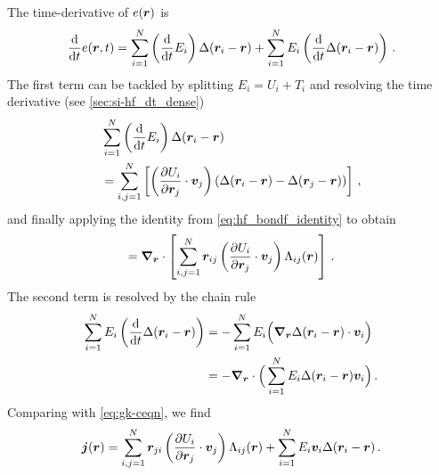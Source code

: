 The time-derivative of $e(\boldsymbol{r})$ is
\begin{equation}
	\frac{\text{d}}{\text{d} t} e(\boldsymbol{r}, t) = \sum_{i=1}^N \left(\frac{\text{d}}{\text{d} t} E_i\right) \Delta(\boldsymbol{r}_i - \boldsymbol{r}) + \sum_{i=1}^N E_i \left(\frac{\text{d}}{\text{d} t} \Delta(\boldsymbol{r}_i - \boldsymbol{r}) \right) \, .
\end{equation}
The first term can be tackled by splitting $E_i = U_i + T_i$ and resolving the time derivative (see \cref{sec:si-hf_dt_dense})
\begin{align}
	&\sum_{i=1}^N \left(\frac{\text{d}}{\text{d} t} E_i\right) \Delta(\boldsymbol{r}_i - \boldsymbol{r})  \\
	&= \sum_{i,j=1}^N \left[\left(\frac{\partial U_{i}}{\partial \boldsymbol{r}_{j}} \cdot \boldsymbol{v}_j\right)  \left(\Delta(\boldsymbol{r}_i - \boldsymbol{r}) - \Delta(\boldsymbol{r}_j - \boldsymbol{r})\right) \right] \, ,
\end{align}
and finally applying the identity from \cref{eq:hf_bondf_identity} to obtain
\begin{equation}
	= \boldsymbol{\nabla}_{\boldsymbol{r}} \cdot \left[\sum_{i,j=1}^N \boldsymbol{r}_{ij} \left(\frac{\partial U_{i}}{\partial \boldsymbol{r}_{j}} \cdot \boldsymbol{v}_j\right) \Lambda_{ij}(\boldsymbol{r}) \right] \, .
\end{equation}
The second term is resolved by the chain rule
\begin{align}
	\sum_{i=1}^N E_i \left(\frac{\text{d}}{\text{d} t} \Delta(\boldsymbol{r}_i - \boldsymbol{r}) \right) &= -\sum_{i=1}^N E_i \Big( \boldsymbol{\nabla}_{\boldsymbol{r}} \Delta(\boldsymbol{r}_i - \boldsymbol{r}) \cdot \boldsymbol{v}_i \Big) \\
	&= -\boldsymbol{\nabla}_{\boldsymbol{r}} \cdot \Big( \sum_{i=1}^N E_i \Delta(\boldsymbol{r}_i - \boldsymbol{r}) \boldsymbol{v}_i \Big) \, .
\end{align}
Comparing with \cref{eq:gk-ceqn}, we find
\begin{equation}
	\densj(\R) = \sum_{i,j=1}^N \R_{ji} \left(\dur{i}{j}{} \cdot \V_j\right) \bondf{ij}{\R} + \sum_{i=1}^N E_i \V_i \localf{\R_i - \R} \, . \label{eq:hf_densj}
\end{equation}

